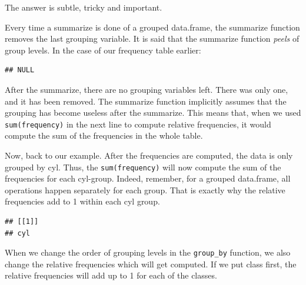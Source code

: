 \documentclass[]{tufte-book}
\newenvironment{Shaded}{}{}
\newcommand{\DataTypeTok}[1]{\textcolor[rgb]{0.56,0.13,0.00}{#1}}
\newcommand{\KeywordTok}[1]{\textcolor[rgb]{0.00,0.44,0.13}{\textbf{#1}}}
\newcommand{\NormalTok}[1]{#1}
\newcommand{\OperatorTok}[1]{\textcolor[rgb]{0.40,0.40,0.40}{#1}}
\newcommand{\StringTok}[1]{\textcolor[rgb]{0.25,0.44,0.63}{#1}}
\begin{document}
The answer is subtle, tricky and important.

Every time a summarize is done of a grouped data.frame, the summarize function removes the last grouping variable. It is said that the summarize function \emph{peels} of group levels. In the case of our frequency table earlier:

\begin{Shaded}
\end{Shaded}

\begin{verbatim}
## NULL
\end{verbatim}

After the summarize, there are no grouping variables left. There was only one, and it has been removed. The summarize function implicitly assumes that the grouping has become useless after the summarize. This means that, when we used \texttt{sum(frequency)} in the next line to compute relative frequencies, it would compute the sum of the frequencies in the whole table.

Now, back to our example. After the frequencies are computed, the data is only grouped by cyl. Thus, the \texttt{sum(frequency)} will now compute the sum of the frequencies for each cyl-group. Indeed, remember, for a grouped data.frame, all operations happen separately for each group. That is exactly why the relative frequencies add to 1 within each cyl group.

\begin{Shaded}
\end{Shaded}

\begin{verbatim}
## [[1]]
## cyl
\end{verbatim}

When we change the order of grouping levels in the \texttt{group\_by} function, we also change the relative frequencies which will get computed. If we put class first, the relative frequencies will add up to 1 for each of the classes.
\end{document}
